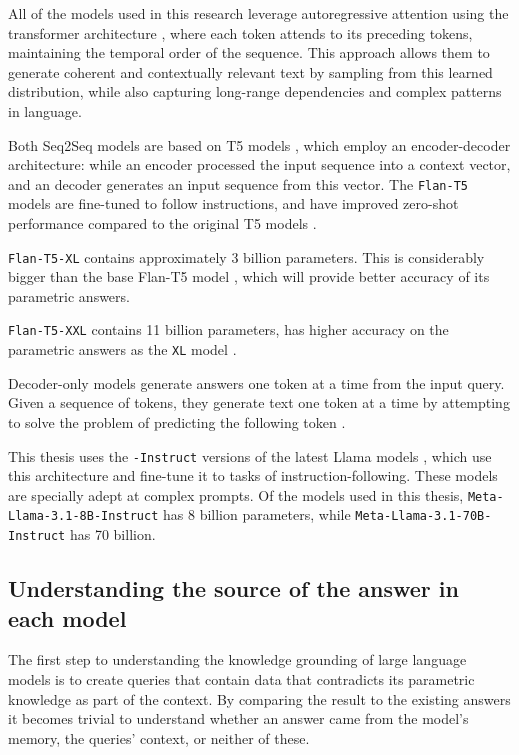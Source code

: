 

All of the models used in this research leverage autoregressive attention using the transformer architecture \cite{attention_is_all_you_need}, where each token attends to its preceding tokens, maintaining the temporal order of the sequence.
This approach allows them to generate coherent and contextually relevant text by sampling from this learned distribution, while also capturing long-range dependencies and complex patterns in language.

Both Seq2Seq models are based on T5 models \cite{t5}, which employ an encoder-decoder architecture: while an encoder processed the input sequence into a context vector, and an decoder generates an input sequence from this vector.
The \texttt{Flan-T5} models are fine-tuned to follow instructions, and have improved zero-shot performance compared to the original T5 models \cite{flant5}.

\texttt{Flan-T5-XL} contains approximately 3 billion parameters.
This is considerably bigger than the base Flan-T5 model \cite{flant5}, which will provide better accuracy of its parametric answers.

\texttt{Flan-T5-XXL} contains 11 billion parameters, has higher accuracy on the parametric answers as the \texttt{XL} model \cite{flant5}.

Decoder-only models generate answers one token at a time from the input query.
Given a sequence of tokens, they generate text one token at a time by attempting to solve the problem of predicting the following token \cite{gpt}.

This thesis uses the \texttt{-Instruct} versions of the latest Llama models \cite{llama3}, which use this architecture and fine-tune it to tasks of instruction-following.
These models are specially adept at complex prompts.
Of the models used in this thesis, \texttt{Meta-Llama-3.1-8B-Instruct} has 8 billion parameters, while \texttt{Meta-Llama-3.1-70B-Instruct} has 70 billion.

\subsection{Understanding the source of the answer in each model}
\label{query_design}

The first step to understanding the knowledge grounding of large language models is to create queries that contain data that contradicts its parametric knowledge as part of the context.
By comparing the result to the existing answers it becomes trivial to understand whether an answer came from the model's memory, the queries' context, or neither of these.

